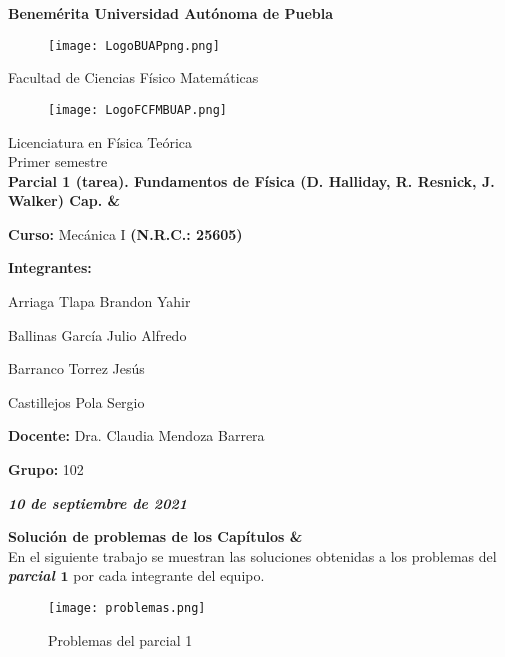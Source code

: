 \documentclass[12pt]{article}
\begin{document}
\thispagestyle{empty} 
\begin{center}
\LARGE{\bf Benemérita Universidad Autónoma de Puebla} \\[0.5cm]
\begin{figure}[htb] 
\centering \texttt{[image: LogoBUAPpng.png]} 
\end{figure}
\LARGE{Facultad de Ciencias Físico Matemáticas}\\[0.5cm]
\begin{figure}[htb] \centering \texttt{[image: LogoFCFMBUAP.png]} \end{figure} 
\Large{Licenciatura en Física Teórica}\\[0.5cm]
\large{Primer semestre}\\[0.5cm] 
{\Large \bfseries{Parcial 1 (tarea). Fundamentos de Física (D. Halliday, R. 		Resnick, J. Walker) Cap. {} \& {}}} \\[0.5cm]
\begin{flushleft}
\large{\bf Curso: } Mecánica I \textbf{(N.R.C.: 25605)}
\end{flushleft}
\large{\bf Integrantes:} \\[0.5cm]
\begin{center}
Arriaga Tlapa Brandon Yahir
\end{center} 
\begin{center}
Ballinas García Julio Alfredo
\end{center} 
\begin{center}
Barranco Torrez Jesús
\end{center}  
\begin{center}
Castillejos Pola Sergio \\[0.5cm]
\end{center} 
\begin{flushleft}
\large{\bf Docente:} Dra. Claudia Mendoza Barrera
\end{flushleft}
\begin{flushleft}
\large{\bf Grupo:} 102 
\end{flushleft}
\vfill
\begin{center} 
\textsl{\textbf{10 de septiembre de 2021}}
\end{center}  
\end{center}  

\newpage

{\Large \bfseries{Solución de problemas de los Capítulos {} \& {}}} \\

\textsf
En el siguiente trabajo se muestran las soluciones obtenidas a los problemas del \textbf{\textit{parcial $\textbf{1}$}} por cada integrante del equipo. 
\begin{figure}[htb] 
\centering \texttt{[image: problemas.png]} 
\caption{Problemas del parcial 1}
\end{figure}
\end{document}
